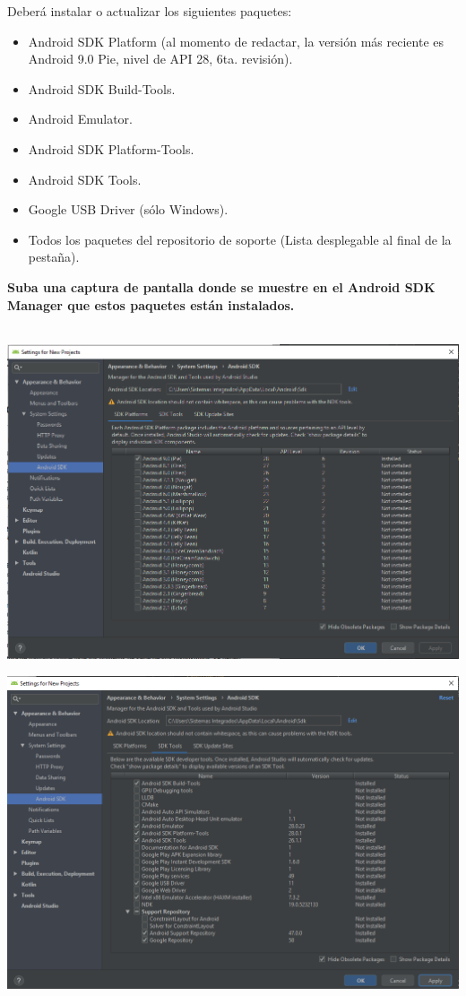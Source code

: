 \documentclass[answers]{exam}
\begin{document}
\begin{questions}
\begin{framed}
    Deberá instalar o actualizar los siguientes paquetes:
    \begin{itemize}
        \item Android SDK Platform (al momento de redactar, la versión más reciente es Android 9.0 Pie, nivel de API 28, 6ta. revisión).
        \item Android SDK Build-Tools.
        \item Android Emulator.
        \item Android SDK Platform-Tools.
        \item Android SDK Tools.
        \item Google USB Driver (sólo Windows).
        \item Todos los paquetes del repositorio de soporte (Lista desplegable al final de la pestaña).
    \end{itemize}
    \textbf{Suba una captura de pantalla donde se muestre en el Android SDK Manager que estos paquetes están instalados.} \\ \\
    \begin{center}
        \includegraphics[width=15.5cm]{img/AndroidSDK_01.png}
    \end{center}
    \begin{center}
        \includegraphics[width=15.5cm]{img/AndroidSDK_02.png}

\end{center}
\end{framed}
\end{questions}
\end{document}
